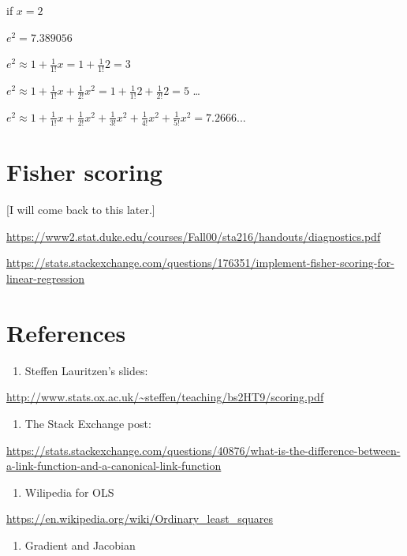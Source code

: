\documentclass[]{book}
\providecommand{\tightlist}{%
  \setlength{\itemsep}{0pt}\setlength{\parskip}{0pt}}
\begin{document}
if \(x=2\)

\(e^2 = 7.389056\)

\(e^2 \approx 1+\frac{1}{1!}x =1+\frac{1}{1!}2=3\)

\(e^2 \approx 1+\frac{1}{1!}x+\frac{1}{2!}x^2 =1+\frac{1}{1!}2 + \frac{1}{2!}2 =5\)
\ldots{}

\(e^2 \approx 1+\frac{1}{1!}x+\frac{1}{2!}x^2 +\frac{1}{3!}x^2+\frac{1}{4!}x^2+\frac{1}{5!}x^2=7.2666...\)

\section{Fisher scoring}\label{fisher-scoring}

{[}I will come back to this later.{]}

\url{https://www2.stat.duke.edu/courses/Fall00/sta216/handouts/diagnostics.pdf}

\url{https://stats.stackexchange.com/questions/176351/implement-fisher-scoring-for-linear-regression}

\section{References}\label{references-1}

\begin{enumerate}
\def\labelenumi{\arabic{enumi}.}
\tightlist
\item
  Steffen Lauritzen's slides:
\end{enumerate}

\url{http://www.stats.ox.ac.uk/~steffen/teaching/bs2HT9/scoring.pdf}

\begin{enumerate}
\def\labelenumi{\arabic{enumi}.}
\setcounter{enumi}{1}
\tightlist
\item
  The Stack Exchange post:
\end{enumerate}

\url{https://stats.stackexchange.com/questions/40876/what-is-the-difference-between-a-link-function-and-a-canonical-link-function}

\begin{enumerate}
\def\labelenumi{\arabic{enumi}.}
\setcounter{enumi}{2}
\tightlist
\item
  Wilipedia for OLS
\end{enumerate}

\url{https://en.wikipedia.org/wiki/Ordinary_least_squares}

\begin{enumerate}
\def\labelenumi{\arabic{enumi}.}
\setcounter{enumi}{3}
\tightlist
\item
  Gradient and Jacobian
\end{enumerate}
\end{document}
